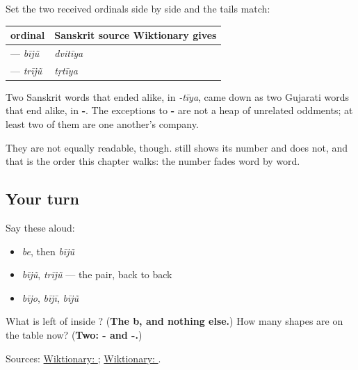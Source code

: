 \begin{grammarlens}[title={What you've built: two words, one shape}]
Set the two received ordinals side by side and the tails match:

\noindent
\begin{tabularx}{\linewidth}{@{}>{\raggedright\arraybackslash}X>{\raggedright\arraybackslash}X@{}}
\toprule
\textbf{ordinal} & \textbf{Sanskrit source Wiktionary gives} \\
\midrule
\textbf{\gu{બીજું}} — \emph{bījũ} & \emph{dvitīya} \\
\textbf{\gu{ત્રીજું}} — \emph{trījũ} & \emph{tṛtīya} \\
\bottomrule
\end{tabularx}

Two Sanskrit words that ended alike, in \emph{-tīya}, came down as two Gujarati words that end alike, in \textbf{-}. The exceptions to \textbf{-} are not a heap of unrelated oddments; at least two of them are one another's company.

They are not equally readable, though. \textbf{} still shows its number and \textbf{} does not, and that is the order this chapter walks: the number fades word by word.
\end{grammarlens}

\subsection*{Your turn}
Say these aloud:

\begin{itemize}
\raggedright
  \item \emph{be}, then \emph{bījũ}
  \item \emph{bījũ}, \emph{trījũ} — the pair, back to back
  \item \emph{bījo}, \emph{bījī}, \emph{bījũ}
\end{itemize}

\begin{tcolorbox}[breakable,colback=teal!4,colframe=teal!35!black,title={Before you move on}]
What is left of \textbf{} inside \textbf{}? (\textbf{The b, and nothing else.}) How many shapes are on the table now? (\textbf{Two: - and -.})

Sources: \href{https://en.wiktionary.org/wiki/\%E0\%AA\%AC\%E0\%AB\%80\%E0\%AA\%9C\%E0\%AB\%81\%E0\%AA\%82}{Wiktionary: }; \href{https://en.wiktionary.org/wiki/\%E0\%AA\%A4\%E0\%AB\%8D\%E0\%AA\%B0\%E0\%AB\%80\%E0\%AA\%9C\%E0\%AB\%81\%E0\%AA\%82}{Wiktionary: }.
\end{tcolorbox}
